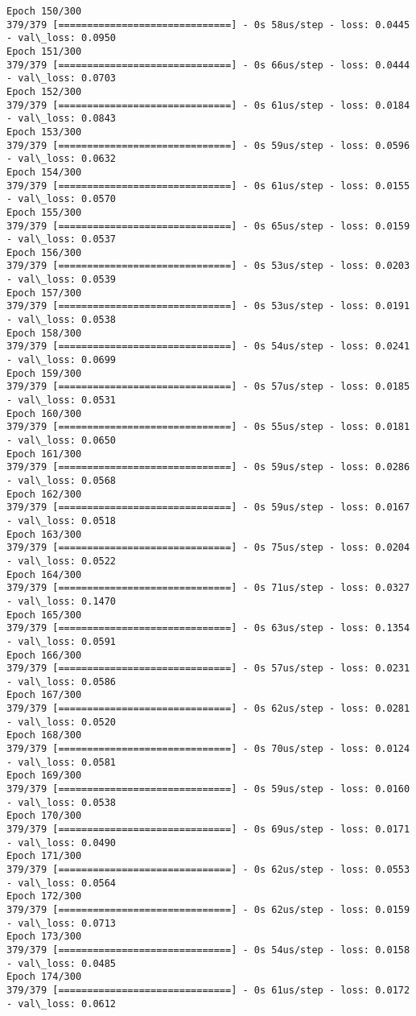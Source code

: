 \documentclass[11pt]{article}
\begin{document}
\begin{Verbatim}[commandchars=\\\{\}]
Epoch 150/300
379/379 [==============================] - 0s 58us/step - loss: 0.0445 - val\_loss: 0.0950
Epoch 151/300
379/379 [==============================] - 0s 66us/step - loss: 0.0444 - val\_loss: 0.0703
Epoch 152/300
379/379 [==============================] - 0s 61us/step - loss: 0.0184 - val\_loss: 0.0843
Epoch 153/300
379/379 [==============================] - 0s 59us/step - loss: 0.0596 - val\_loss: 0.0632
Epoch 154/300
379/379 [==============================] - 0s 61us/step - loss: 0.0155 - val\_loss: 0.0570
Epoch 155/300
379/379 [==============================] - 0s 65us/step - loss: 0.0159 - val\_loss: 0.0537
Epoch 156/300
379/379 [==============================] - 0s 53us/step - loss: 0.0203 - val\_loss: 0.0539
Epoch 157/300
379/379 [==============================] - 0s 53us/step - loss: 0.0191 - val\_loss: 0.0538
Epoch 158/300
379/379 [==============================] - 0s 54us/step - loss: 0.0241 - val\_loss: 0.0699
Epoch 159/300
379/379 [==============================] - 0s 57us/step - loss: 0.0185 - val\_loss: 0.0531
Epoch 160/300
379/379 [==============================] - 0s 55us/step - loss: 0.0181 - val\_loss: 0.0650
Epoch 161/300
379/379 [==============================] - 0s 59us/step - loss: 0.0286 - val\_loss: 0.0568
Epoch 162/300
379/379 [==============================] - 0s 59us/step - loss: 0.0167 - val\_loss: 0.0518
Epoch 163/300
379/379 [==============================] - 0s 75us/step - loss: 0.0204 - val\_loss: 0.0522
Epoch 164/300
379/379 [==============================] - 0s 71us/step - loss: 0.0327 - val\_loss: 0.1470
Epoch 165/300
379/379 [==============================] - 0s 63us/step - loss: 0.1354 - val\_loss: 0.0591
Epoch 166/300
379/379 [==============================] - 0s 57us/step - loss: 0.0231 - val\_loss: 0.0586
Epoch 167/300
379/379 [==============================] - 0s 62us/step - loss: 0.0281 - val\_loss: 0.0520
Epoch 168/300
379/379 [==============================] - 0s 70us/step - loss: 0.0124 - val\_loss: 0.0581
Epoch 169/300
379/379 [==============================] - 0s 59us/step - loss: 0.0160 - val\_loss: 0.0538
Epoch 170/300
379/379 [==============================] - 0s 69us/step - loss: 0.0171 - val\_loss: 0.0490
Epoch 171/300
379/379 [==============================] - 0s 62us/step - loss: 0.0553 - val\_loss: 0.0564
Epoch 172/300
379/379 [==============================] - 0s 62us/step - loss: 0.0159 - val\_loss: 0.0713
Epoch 173/300
379/379 [==============================] - 0s 54us/step - loss: 0.0158 - val\_loss: 0.0485
Epoch 174/300
379/379 [==============================] - 0s 61us/step - loss: 0.0172 - val\_loss: 0.0612

\end{Verbatim}
\end{document}
